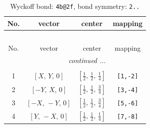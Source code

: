 \documentclass[fleqn,8pt]{jsarticle}
\begin{document}
\renewcommand{\arraystretch}{1.2}
\begin{longtable}{cccc}
\caption{Wyckoff bond: {\tt 4b@2f}, bond symmetry: {\tt 2..}}
 \\
 \hline \hline
No. & vector & center & mapping \\ \hline \endfirsthead

\multicolumn{3}{l}{\tablename\ \thetable{}} \\
 \hline \hline
No. & vector & center & mapping \\ \hline \endhead

 \hline \hline
\multicolumn{3}{r}{\footnotesize\it continued ...} \\ \endfoot

 \hline \hline
\multicolumn{3}{r}{} \\ \endlastfoot

1 & $\left[ X,\, Y,\, 0 \right]$ & $\left[ \frac{1}{2},\, \frac{1}{2},\, \frac{1}{4} \right]$ & {\tt [1,-2]} \\ \hline
2 & $\left[ - Y,\, X,\, 0 \right]$ & $\left[ \frac{1}{2},\, \frac{1}{2},\, \frac{3}{4} \right]$ & {\tt [3,-4]} \\ \hline
3 & $\left[ - X,\, - Y,\, 0 \right]$ & $\left[ \frac{1}{2},\, \frac{1}{2},\, \frac{3}{4} \right]$ & {\tt [5,-6]} \\ \hline
4 & $\left[ Y,\, - X,\, 0 \right]$ & $\left[ \frac{1}{2},\, \frac{1}{2},\, \frac{1}{4} \right]$ & {\tt [7,-8]} \\
\end{longtable}
\renewcommand{\arraystretch}{1.2}
\end{document}

